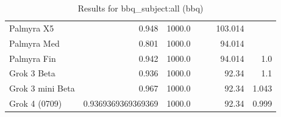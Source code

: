 \begin{table}[htp]
{\begin{tabular}{lrrrrrr}
Palmyra X5 & 0.948 & 1000.0 &  &  & 103.014 &  \\
Palmyra Med & 0.801 & 1000.0 &  &  & 94.014 &  \\
Palmyra Fin & 0.942 & 1000.0 &  &  & 94.014 & 1.0 \\
Grok 3 Beta & 0.936 & 1000.0 &  &  & 92.34 & 1.1 \\
Grok 3 mini Beta & 0.967 & 1000.0 &  &  & 92.34 & 1.043 \\
Grok 4 (0709) & 0.9369369369369369 & 1000.0 &  &  & 92.34 & 0.999 \\
\bottomrule
\end{tabular}}
\caption{Results for bbq_subject:all (bbq)}
\label{fig:bbq_subject:all (bbq)}
\end{table}